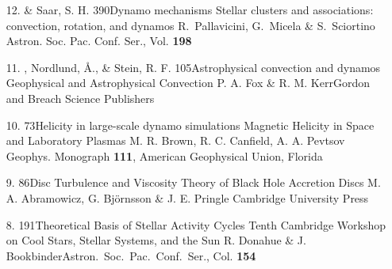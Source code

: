 \begin{itemize}
\item[12.]
\Brandenburg \& Saar, S. H.
{390}{Dynamo mechanisms}
{Stellar clusters and associations: convection, rotation, and dynamos}
{R.\ Pallavicini, G.\ Micela \& S.\ Sciortino}
{Astron. Soc. Pac. Conf. Ser., Vol. {\bf 198}}

\item[11.]
\Brandenburg, Nordlund, \AA., \& Stein, R. F.
{105}{Astrophysical convection and dynamos}
{Geophysical and Astrophysical Convection}
{P. A. Fox \& R. M. Kerr}{Gordon and Breach Science Publishers}



\item[10.]
\Brandenburg{}
{73}{Helicity in large-scale dynamo simulations}
{Magnetic Helicity in Space and Laboratory Plasmas}
{M. R. Brown, R. C. Canfield, A. A. Pevtsov}
{Geophys. Monograph {\bf 111}, American Geophysical Union, Florida}

\item[9.]
\Brandenburg{}
{86}{Disc Turbulence and Viscosity}
{Theory of Black Hole Accretion Discs}
{M. A. Abramowicz, G. Bj\"ornsson \& J. E. Pringle}
{Cambridge University Press}

\item[8.]
\Brandenburg{}
{191}{Theoretical Basis of Stellar Activity Cycles}
{Tenth Cambridge Workshop on Cool Stars, Stellar Systems, and the Sun}
{R. Donahue \& J. Bookbinder}{Astron.\ Soc.\ Pac.\ Conf.\ Ser., Col. {\bf 154}}


\end{itemize}
